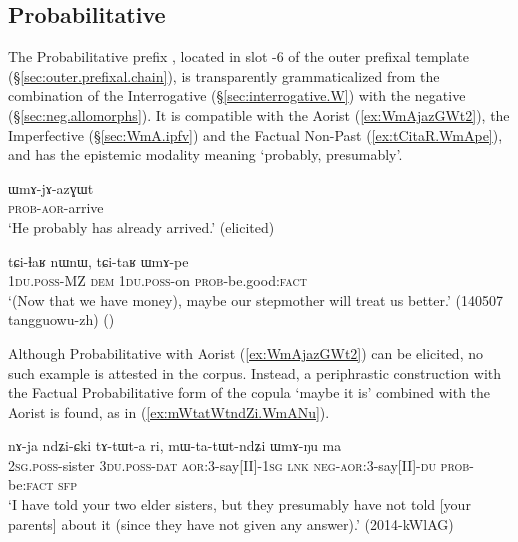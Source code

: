 \subsection{Probabilitative} \label{sec:WmA}
The Probabilitative prefix , located in slot -6 of the outer prefixal template (§\ref{sec:outer.prefixal.chain}), is transparently grammaticalized from the combination of the Interrogative  (§\ref{sec:interrogative.W}) with the negative  (§\ref{sec:neg.allomorphs}). It is compatible with the Aorist  (\ref{ex:WmAjazGWt2}), the Imperfective (§\ref{sec:WmA.ipfv}) and the Factual Non-Past (\ref{ex:tCitaR.WmApe}), and has the epistemic modality meaning `probably, presumably'.

 \begin{exe}
 \ex \label{ex:WmAjazGWt2}
\gll ɯmɤ-jɤ-azɣɯt  \\
\textsc{prob}-\textsc{aor}-arrive \\
\glt `He probably has already arrived.' (elicited)
\end{exe}

 \begin{exe}
 \ex \label{ex:tCitaR.WmApe}
\gll tɕi-ɬaʁ nɯnɯ, tɕi-taʁ ɯmɤ-pe \\
\textsc{1du}.\textsc{poss}-MZ \textsc{dem} \textsc{1du}.\textsc{poss}-on \textsc{prob}-be.good:\textsc{fact} \\
\glt `(Now that we have money), maybe our stepmother will treat us better.' (140507 tangguowu-zh) ()
\end{exe}

Although Probabilitative with Aorist (\ref{ex:WmAjazGWt2}) can be elicited, no such example is attested in the corpus. Instead, a periphrastic construction with the Factual Probabilitative form of the copula  `maybe it is' combined with the Aorist is found, as in (\ref{ex:mWtatWtndZi.WmANu}).
 
 \begin{exe}
 \ex \label{ex:mWtatWtndZi.WmANu}
\gll nɤ-ja ndʑi-ɕki tɤ-tɯt-a ri, mɯ-ta-tɯt-ndʑi ɯmɤ-ŋu ma \\
\textsc{2sg}.\textsc{poss}-sister \textsc{3du}.\textsc{poss}-\textsc{dat} \textsc{aor}:3\flobv{}-say[II]-\textsc{1sg} \textsc{lnk} \textsc{neg}-\textsc{aor}:3\flobv{}-say[II]-\textsc{du} \textsc{prob}-be:\textsc{fact} \textsc{sfp} \\
\glt `I have told your two elder sisters, but they presumably have not told [your parents] about it (since they have not given any answer).' (2014-kWlAG)
\end{exe}

